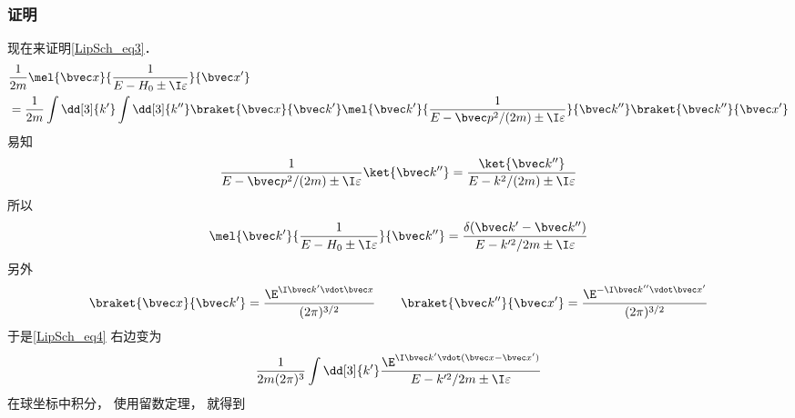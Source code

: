\subsubsection{证明}
现在来证明\autoref{LipSch_eq3}．
\begin{equation}\label{LipSch_eq4}
\begin{aligned}
&\frac{1}{2m} \mel{\bvec x}{\frac{1}{E-H_0\pm \I\varepsilon}}{\bvec x'}\\
&= \frac{1}{2m} \int \dd[3]{k'} \int \dd[3]{k''} \braket{\bvec x}{\bvec k'}\mel{\bvec k'}{\frac{1}{E-\bvec p^2/(2m)\pm \I\varepsilon}}{\bvec k''} \braket{\bvec k''}{\bvec x'}
\end{aligned}
\end{equation}
易知
\begin{equation}
\frac{1}{E-\bvec p^2/(2m)\pm \I\varepsilon}\ket{\bvec k''} = \frac{\ket{\bvec k''}}{E- k^2/(2m)\pm \I\varepsilon}
\end{equation}
所以
\begin{equation}
\mel{\bvec k'}{\frac{1}{E-H_0\pm \I\varepsilon}}{\bvec k''} = \frac{\delta(\bvec k'-\bvec k'')}{E-k'^2/2m\pm\I\varepsilon}
\end{equation}
另外
\begin{equation}
\braket{\bvec x}{\bvec k'} = \frac{\E^{\I \bvec k'\vdot \bvec x}}{(2\pi)^{3/2}}
\qquad
\braket{\bvec k''}{\bvec x'} = \frac{\E^{-\I \bvec k''\vdot \bvec x'}}{(2\pi)^{3/2}}
\end{equation}
于是\autoref{LipSch_eq4} 右边变为
\begin{equation}
\frac{1}{2m(2\pi)^3}\int\dd[3]{k'}  \frac{\E^{\I \bvec k'\vdot (\bvec x-\bvec x')}}{E-k'^2/2m\pm\I\varepsilon}
\end{equation}
在球坐标中积分， 使用留数定理， 就得到
